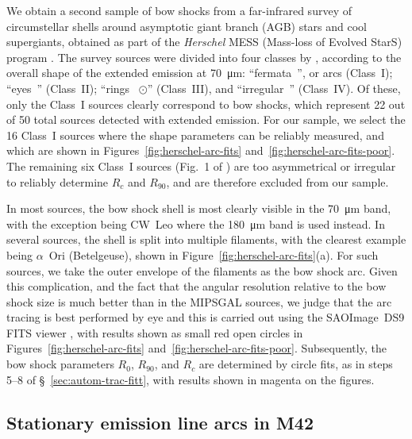 We obtain a second sample of bow shocks from a far-infrared survey
\citep{Cox:2012a} of circumstellar shells around asymptotic giant
branch (AGB) stars and cool supergiants, obtained as part of the
\textit{Herschel} MESS (Mass-loss of Evolved StarS) program
\citep{Groenewegen:2011a}.  The survey sources were divided into four
classes by \citeauthor{Cox:2012a}, according to the overall shape of
the extended emission at \SI{70}{\um}: ``fermata~\textfermata'', or
arcs (Class~I); ``eyes~\faEye'' (Class~II); ``rings~{\Large
  \(\odot\)}'' (Class~III), and ``irregular~\staveXXV'' (Class~IV).  Of
these, only the Class~I sources clearly correspond to bow shocks,
which represent 22 out of 50 total sources detected with extended
emission.  For our sample, we select the 16 Class~I sources where the
shape parameters can be reliably measured, and which are shown in
Figures~\ref{fig:herschel-arc-fits}
and~\ref{fig:herschel-arc-fits-poor}. The remaining six Class~I
sources (Fig.~1 of \citealp{Cox:2012a}) are too asymmetrical or
irregular to reliably determine \(R_{c}\) and \(R_{90}\), and are
therefore excluded from our sample.

In most sources, the bow shock shell is most clearly visible in the
\SI{70}{\um} band, with the exception being CW~Leo where the
\SI{180}{\um} band is used instead.  In several sources, the shell is
split into multiple filaments, with the clearest example being
\(\alpha\)~Ori (Betelgeuse), shown in
Figure~\ref{fig:herschel-arc-fits}(a).  For such sources, we take the
outer envelope of the filaments as the bow shock arc.  Given this
complication, and the fact that the angular resolution relative to the
bow shock size is much better than in the MIPSGAL sources, we judge
that the arc tracing is best performed by eye and this is carried out
using the SAOImage~DS9 FITS viewer \citep{Joye:2003a}, with results
shown as small red open circles in Figures~\ref{fig:herschel-arc-fits}
and~\ref{fig:herschel-arc-fits-poor}.  Subsequently, the bow shock
parameters \(R_0\), \(R_{90}\), and \(R_c\) are determined by circle
fits, as in steps 5--8 of \S~\ref{sec:autom-trac-fitt}, with results
shown in magenta on the figures.


\subsection{Stationary emission line arcs in M42}
\label{sec:stat-emiss-line}

